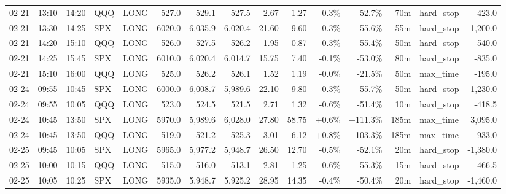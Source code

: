 \documentclass[11pt,a4paper,twoside]{article}
\begin{document}
\begin{landscape}
\begin{center}
\begin{longtable}{>{\color{txtmain}}l l l l l r r r r r r r r >{\color{txtmain}}l r}
02-21 & 13:10 & 14:20 & QQQ & LONG & 527.0 & 529.1 & 527.5 & 2.67 & 1.27 & \textcolor{lossred}{-0.3\%} & \textcolor{lossred}{-52.7\%} & 70m & hard\_stop & \textcolor{lossred}{-423.0} \\
02-21 & 13:30 & 14:25 & SPX & LONG & 6020.0 & 6,035.9 & 6,020.4 & 21.60 & 9.60 & \textcolor{lossred}{-0.3\%} & \textcolor{lossred}{-55.6\%} & 55m & hard\_stop & \textcolor{lossred}{-1,200.0} \\
02-21 & 14:20 & 15:10 & QQQ & LONG & 526.0 & 527.5 & 526.2 & 1.95 & 0.87 & \textcolor{lossred}{-0.3\%} & \textcolor{lossred}{-55.4\%} & 50m & hard\_stop & \textcolor{lossred}{-540.0} \\
02-21 & 14:25 & 15:45 & SPX & LONG & 6010.0 & 6,020.4 & 6,014.7 & 15.75 & 7.40 & \textcolor{lossred}{-0.1\%} & \textcolor{lossred}{-53.0\%} & 80m & hard\_stop & \textcolor{lossred}{-835.0} \\
02-21 & 15:10 & 16:00 & QQQ & LONG & 525.0 & 526.2 & 526.1 & 1.52 & 1.19 & \textcolor{lossred}{-0.0\%} & \textcolor{lossred}{-21.5\%} & 50m & max\_time & \textcolor{lossred}{-195.0} \\
02-24 & 09:55 & 10:45 & SPX & LONG & 6000.0 & 6,008.7 & 5,989.6 & 22.10 & 9.80 & \textcolor{lossred}{-0.3\%} & \textcolor{lossred}{-55.7\%} & 50m & hard\_stop & \textcolor{lossred}{-1,230.0} \\
02-24 & 09:55 & 10:05 & QQQ & LONG & 523.0 & 524.5 & 521.5 & 2.71 & 1.32 & \textcolor{lossred}{-0.6\%} & \textcolor{lossred}{-51.4\%} & 10m & hard\_stop & \textcolor{lossred}{-418.5} \\
02-24 & 10:45 & 13:50 & SPX & LONG & 5970.0 & 5,989.6 & 6,028.0 & 27.80 & 58.75 & \textcolor{wingreen}{+0.6\%} & \textcolor{wingreen}{+111.3\%} & 185m & max\_time & \textcolor{wingreen}{3,095.0} \\
02-24 & 10:45 & 13:50 & QQQ & LONG & 519.0 & 521.2 & 525.3 & 3.01 & 6.12 & \textcolor{wingreen}{+0.8\%} & \textcolor{wingreen}{+103.3\%} & 185m & max\_time & \textcolor{wingreen}{933.0} \\
02-25 & 09:45 & 10:05 & SPX & LONG & 5965.0 & 5,977.2 & 5,948.7 & 26.50 & 12.70 & \textcolor{lossred}{-0.5\%} & \textcolor{lossred}{-52.1\%} & 20m & hard\_stop & \textcolor{lossred}{-1,380.0} \\
02-25 & 10:00 & 10:15 & QQQ & LONG & 515.0 & 516.0 & 513.1 & 2.81 & 1.25 & \textcolor{lossred}{-0.6\%} & \textcolor{lossred}{-55.3\%} & 15m & hard\_stop & \textcolor{lossred}{-466.5} \\
02-25 & 10:05 & 10:25 & SPX & LONG & 5935.0 & 5,948.7 & 5,925.2 & 28.95 & 14.35 & \textcolor{lossred}{-0.4\%} & \textcolor{lossred}{-50.4\%} & 20m & hard\_stop & \textcolor{lossred}{-1,460.0} \\

\end{longtable}
\end{center}
\end{landscape}
\end{document}
